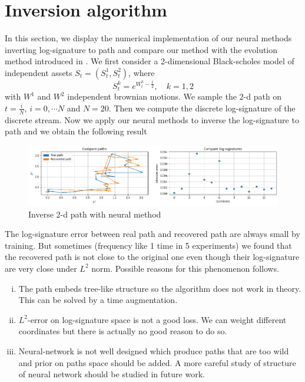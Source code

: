 \documentclass[12pt]{report}
\theoremstyle{definition}
\theoremstyle{remark}
\begin{document}
\section{Inversion algorithm}
In this section, we display the numerical implementation of our neural methods inverting log-signature to path and compare our method with the evolution method introduced in \cite{buehler2020data}. We first consider a 2-dimensional Black-scholes model of independent assets $S_{t} = (S^{1}_{t}, S^{2}_{t})$, where
\begin{equation*}
  S^{k}_{t} = e^{W^{k}_{t} - \frac{t}{2}},\quad k = 1,2
\end{equation*}
with $W^{1}$ and $W^{2}$ independent brownian motions. We sample the $2$-d path on $t = \frac{i}{N}$, $i = 0,\cdots N$ and $N = 20$. Then we compute the discrete log-signature of the discrete stream. Now we apply our neural methods to inverse the log-signature to path and we obtain the following result
 \begin{figure}[H]
    \centering
    \includegraphics[width=\textwidth]{figs/inverse2.png}
    \caption{Inverse 2-d path with neural method}
\end{figure}
The log-signature error between real path and recovered path are always small by training. But sometimes (frequency like 1 time in 5 experiments) we found that the recovered path is not close to the original one even though their log-signature are very close under $L^{2}$ norm. Possible reasons for this phenomenon follows.
\begin{enumerate}[(i)]
  \item The path embeds tree-like structure so the algorithm does not work in theory. This can be solved by a time augmentation. 
  \item $L^{2}$-error on log-signature space is not a good loss. We can weight different coordinates but there is actually no good reason to do so.
  \item Neural-network is not well designed which produce paths that are too wild and prior on paths space should be added. A more careful study of structure of neural network should be studied in future work.
\end{enumerate}
\end{document}
